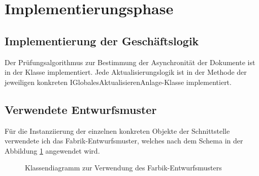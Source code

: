 \clearpage
\section{Implementierungsphase} 
\label{sec:Implementierungsphase}

\subsection{Implementierung der Geschäftslogik}
\label{sec:ImplementierungGeschaeftslogik}

Der Prüfungsalgorithmus zur Bestimmung der Asynchronität der Dokumente ist in der Klasse   implementiert.
Jede Aktualisierungslogik ist in der Methode  der jeweiligen konkreten I\-Glo\-ba\-les\-Ak\-tu\-a\-li\-sie\-ren\-An\-la\-ge-Klasse implementiert.

\subsection{Verwendete Entwurfsmuster}
\label{sec:Entwurfsmuster}

Für die Instanziierung der einzelnen konkreten Objekte der Schnittstelle  verwendete ich das Fabrik-Entwurfsmuster, welches nach dem Schema in der Abbildung \ref{fig:FactoryPattern} angewendet wird.

\begin{figure}
	\centering
	\caption{Klassendiagramm zur Verwendung des Farbik-Entwurfsmusters}
	\label{fig:FactoryPattern}
\end{figure}

